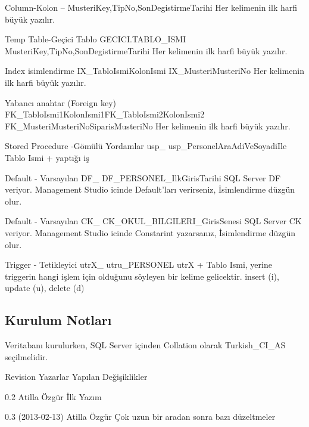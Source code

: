 \documentclass[10pt,a4paper,draft]{article}
\begin{document}
     Column-Kolon 
     -- 
    MusteriKey,TipNo,SonDegistirmeTarihi 
    Her kelimenin ilk harfi büyük yazılır. 
  
     Temp Table-Geçici Tablo 
     GECICI.TABLO\_ISMI 
    MusteriKey,TipNo,SonDegistirmeTarihi 
    Her kelimenin ilk harfi büyük yazılır. 
  
     Index isimlendirme 
     IX\_TabloIsmiKolonIsmi 
     IX\_MusteriMusteriNo 
    Her kelimenin ilk harfi büyük yazılır. 
  
     Yabancı anahtar (Foreign key) 
     FK\_TabloIsmi1KolonIsmi1FK\_TabloIsmi2KolonIsmi2 
     FK\_MusteriMusteriNoSiparisMusteriNo 
    Her kelimenin ilk harfi büyük yazılır. 
  
     Stored Procedure -Gömülü Yordamlar 
     usp\_ 
     usp\_PersonelAraAdiVeSoyadiIle 
     Tablo Ismi + yaptığı iş 		  
  
    Default - Varsayılan 
     DF\_ 
     DF\_PERSONEL\_IlkGirisTarihi 
     SQL Server DF veriyor. Management Studio icinde Default'ları 
      verirseniz, İsimlendirme düzgün olur. 		  
  
     Default - Varsayılan 
     CK\_ 
     CK\_OKUL\_BILGILERI\_GirisSenesi 
     SQL Server CK veriyor. Management Studio icinde Constarint 
      yazarsanız, İsimlendirme düzgün olur. 				 
  
     Trigger - Tetikleyici 
     utrX\_ 
     utru\_PERSONEL 
      utrX + Tablo Ismi, yerine triggerin hangi işlem için olduğunu 
      söyleyen bir kelime gelicektir. insert (i), update (u), delete (d)
  
\subsection{Kurulum Notları}
Veritabanı kurulurken, SQL Server içinden Collation olarak Turkish\_CI\_AS 
seçilmelidir. 
  
      
      
Revision 
Yazarlar 
Yapılan Değişiklikler 
  
     0.2  
     Atilla Özgür 
    İlk Yazım 
    
  
     0.3 (2013-02-13) 
     Atilla Özgür 
    Çok uzun bir aradan sonra bazı düzeltmeler 
    
    
\end{document}
